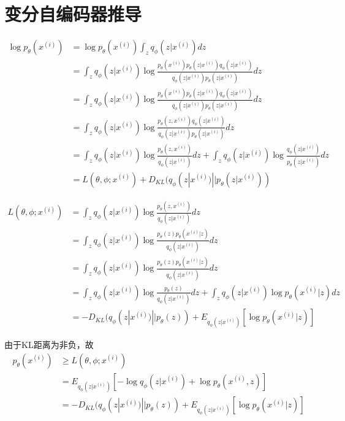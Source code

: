 \documentclass{ctexart}
\begin{document}
\section{变分自编码器推导}
\begin{align*}
\log p_\theta (x^{(i)})
&=\log p_\theta (x^{(i)}) \int_z q_{\phi}  (z | x^{(i)}) dz\\
&=  \int_z q_{\phi}  (z | x^{(i)}) \log \frac{p_\theta (x^{(i)}) p_{\theta}  (z | x^{(i)}) q_{\phi}  (z | x^{(i)})}{q_{\phi}  (z | x^{(i)}) p_{\theta}  (z | x^{(i)})} dz\\
&=  \int_z q_{\phi}  (z | x^{(i)}) \log \frac{p_\theta (x^{(i)}) p_{\theta}  (z | x^{(i)}) q_{\phi}  (z | x^{(i)})}{q_{\phi}  (z | x^{(i)}) p_{\theta}  (z | x^{(i)})} dz\\
&=  \int_z q_{\phi}  (z | x^{(i)}) \log \frac{p_\theta (z,x^{(i)}) q_{\phi}(z | x^{(i)}) }{ q_{\phi}  (z | x^{(i)}) p_{\theta}  (z | x^{(i)})} dz\\
&= \int_z q_{\phi}(z | x^{(i)}) \log \frac{p_\theta (z,x^{(i)})}{ q_{\phi}(z | x^{(i)})} dz + \int_z q_{\phi}(z | x^{(i)}) \log \frac{q_\phi (z | x^{(i)})}{ p_{\theta}(z | x^{(i)})} dz\\
&= L(\theta, \phi; x^{(i)}) + D_{KL}(q_{\phi}(z | x^{(i)}) || p_{\theta}  (z | x^{(i)}))
\end{align*}

\begin{align*}
L(\theta, \phi; x^{(i)})
&= \int_z q_{\phi}(z | x^{(i)}) \log \frac{p_\theta (z,x^{(i)})}{ q_{\phi}(z | x^{(i)})} dz\\
&= \int_z q_{\phi}(z | x^{(i)}) \log \frac{p_\theta (z) p_\theta (x^{(i)} | z)}{ q_{\phi}(z | x^{(i)})} dz\\
&= \int_z q_{\phi}(z | x^{(i)}) \log \frac{p_\theta (z) p_\theta (x^{(i)} | z)}{ q_{\phi}(z | x^{(i)})} dz \\
&= \int_z q_{\phi}(z | x^{(i)}) \log \frac{p_\theta (z) }{ q_{\phi}(z | x^{(i)})} dz +  \int_z q_{\phi}(z | x^{(i)}) \log p_\theta (x^{(i)} | z) dz \\
&= -D_{KL}(q_{\phi}(z | x^{(i)}) || p_\theta (z)) + E_{q_{\phi}(z | x^{(i)})}[\log p_\theta (x^{(i)} | z) ]
\end{align*}

由于KL距离为非负，故
\begin{align*}
p_\theta (x^{(i)}) 
&\geq L(\theta, \phi; x^{(i)})\\
&= E_{q_{\phi}(z | x^{(i)})} [ -\log q_{\phi}(z|x^{(i)}) + \log  p_{\theta} (x^{(i)}, z) ]\\
&= -D_{KL}(q_{\phi}(z | x^{(i)}) || p_\theta (z)) + E_{q_{\phi}(z | x^{(i)})}[\log p_\theta (x^{(i)} | z) ]
\end{align*}
\end{document}
